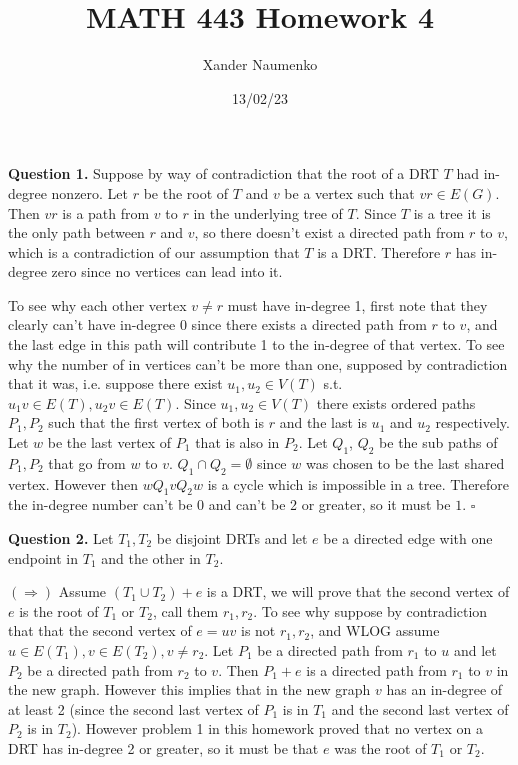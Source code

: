 \documentclass[letterpaper, reqno,11pt]{article}
\begin{document}
\title{MATH 443 Homework 4}
\date{13/02/23}
\author{Xander Naumenko}
\maketitle

{\medskip\noindent\bf Question 1.} Suppose by way of contradiction that the root of a DRT $T$ had in-degree nonzero. Let $r$ be the root of $T$ and $v$ be a vertex such that $vr\in E(G)$. Then $vr$ is a path from $v$ to $r$ in the underlying tree of $T$. Since $T$ is a tree it is the only path between $r$ and $v$, so there doesn't exist a directed path from $r$ to $v$, which is a contradiction of our assumption that $T$ is a DRT. Therefore $r$ has in-degree zero since no vertices can lead into it. 

To see why each other vertex $v\neq r$ must have in-degree 1, first note that they clearly can't have in-degree 0 since there exists a directed path from $r$ to $v$, and the last edge in this path will contribute 1 to the in-degree of that vertex. To see why the number of in vertices can't be more than one, supposed by contradiction that it was, i.e. suppose there exist $u_1,u_2\in V(T)$ s.t. $u_1v\in E(T), u_2v\in E(T)$. Since $u_1,u_2\in V(T)$ there exists ordered paths $P_1,P_2$ such that the first vertex of both is $r$ and the last is $u_1$ and $u_2$ respectively. Let $w$ be the last vertex of $P_1$ that is also in $P_2$. Let $Q_1$, $Q_2$ be the sub paths of $P_1,P_2$ that go from $w$ to $v$. $Q_1\cap Q_2=\emptyset$ since $w$ was chosen to be the last shared vertex. However then $wQ_1vQ_2w$ is a cycle which is impossible in a tree. Therefore the in-degree number can't be 0 and can't be 2 or greater, so it must be $1$. $\square$

{\medskip\noindent\bf Question 2.} Let $T_1,T_2$ be disjoint DRTs and let $e$ be a directed edge with one endpoint in $T_1$ and the other in $T_2$. 

$(\Rightarrow)$ Assume $(T_1\cup T_2)+e$ is a DRT, we will prove that the second vertex of $e$ is the root of $T_1$ or $T_2$, call them $r_1,r_2$. To see why suppose by contradiction that that the second vertex of $e=uv$ is not $r_1,r_2$, and WLOG assume $u\in E(T_1),v\in E(T_2), v\neq r_2$. Let $P_1$ be a directed path from $r_1$ to $u$ and let $P_2$ be a directed path from $r_2$ to $v$. Then $P_1+e$ is a directed path from $r_1$ to $v$ in the new graph. However this implies that in the new graph $v$ has an in-degree of at least 2 (since the second last vertex of $P_1$ is in $T_1$ and the second last vertex of $P_2$ is in $T_2$). However problem 1 in this homework proved that no vertex on a DRT has in-degree 2 or greater, so it must be that $e$ was the root of $T_1$ or $T_2$. 
\end{document}
